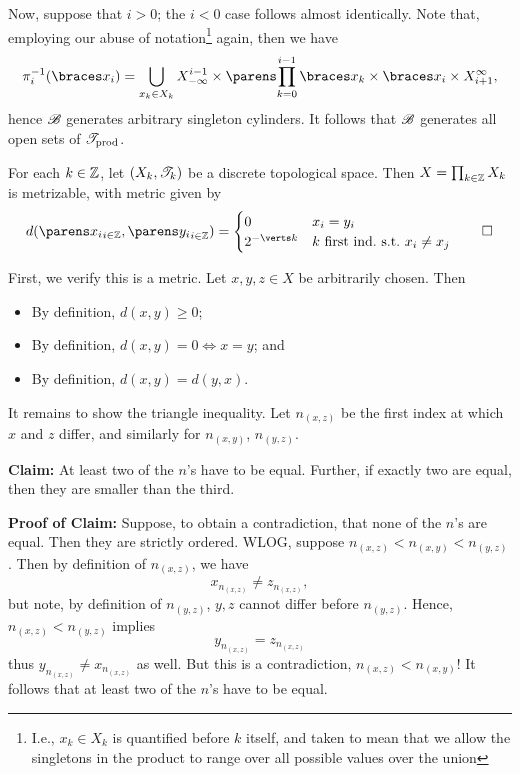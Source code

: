 \documentclass{fkpaper}
\begin{document}
\begin{multicols}{2}
\begin{sproof}
  Now, suppose that $i > 0$; the $i < 0$ case follows almost
  identically. Note that, employing our abuse of
  notation\footnote{I.e., $x_k \in X_k$ is quantified before $k$
    itself, and taken to mean that we allow the singletons in the
    product to range over all possible values over the union} again,
  then we have
  \[
    \pi_{i}^{-1}(\set{x_i}) = \bigcup_{x_k \in X_k} X_{-\infty}^{i -
      1} \times \pn{\prod_{k=0}^{i-1} \set{x_k}} \times \set{x_i}
    \times X_{i+1}^{\infty},
  \]
  hence ${\mathscr{B}}$ generates arbitrary singleton cylinders. It follows
  that ${\mathscr{B}}$ generates all open sets of ${\mathscr{T}}_{\rm prod}$.
\end{sproof}



\begin{proposition}\label{prop:product-metrizable}%
  For each $k \in \mathbb{Z}$, let $(X_k, {\mathscr{T}}_k)$ be a discrete topological
  space. Then $X = \prod_{k\in\mathbb{Z}} X_k$ is metrizable, with metric
  given by
  \[
    d(\pn{x_i}_{i \in \ZZ}, \pn{y_i}_{i \in \ZZ}) =
    \begin{cases}
      0 & x_i = y_i \\
      2^{-\abs{k}} & k \textnormal{ first ind.\ s.t.\ } x_i \neq x_j
    \end{cases} \qedhere
  \]
\end{proposition}
\begin{sproof}
  First, we verify this is a metric. Let $x,y,z \in X$ be arbitrarily
  chosen. Then
  \begin{itemize}
    \item By definition, $d(x,y) \geq 0$;
    \item By definition, $d(x,y) = 0 \iff x = y$; and
    \item By definition, $d(x,y) = d(y,x)$.
  \end{itemize}
  It remains to show the triangle inequality. Let $n_{(x,z)}$ be the
  first index at which $x$ and $z$ differ, and similarly for
  $n_{(x,y)}$, $n_{(y,z)}$.

  \noindent \textbf{Claim:} At least two of the $n$'s have to be
  equal. Further, if exactly two are equal, then they are smaller than
  the third.

  \noindent \textbf{Proof of Claim:} Suppose, to obtain a
  contradiction, that none of the $n$'s are equal. Then they are
  strictly ordered. WLOG, suppose $n_{(x,z)} < n_{(x,y)} < n_{(y,z)}$.
  Then by definition of $n_{(x,z)}$, we have
  \[
    x_{n_{(x,z)}} \neq z_{n_{(x,z)}},
  \]
  but note, by definition of $n_{(y,z)}$, $y,z$ cannot differ before
  $n_{(y,z)}$. Hence, $n_{(x,z)} < n_{(y,z)}$ implies
  \[
    y_{n_{(x,z)}} = z_{n_{(x,z)}}
  \]
  thus $y_{n_{(x,z)}} \neq x_{n_{(x,z)}}$ as well. But this is a
  contradiction, $n_{(x,z)} < n_{(x,y)}$! It follows that at least two
  of the $n$'s have to be equal.


\end{sproof}
\end{multicols}
\end{document}
